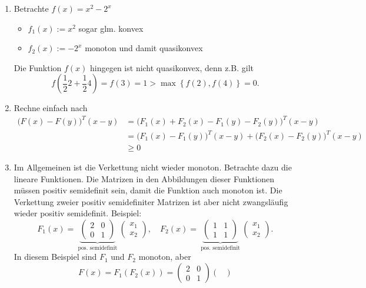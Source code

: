 \begin{enumerate}[label=(\alph{enumi})]
	\item Betrachte $f(x) = x^{2} - 2^{x}$
		\begin{itemize}
			\item $f_{1}(x):=x^2$ sogar glm. konvex
			\item $f_2(x):=-2^{x}$ monoton und damit quasikonvex
		\end{itemize}
		Die Funktion $f(x)$ hingegen ist nicht quasikonvex, denn z.B. gilt
		\[
			f(\frac{1}{2}2 + \frac{1}{2}4) = f(3) = 1 > \max\limits_{} \left\{ f(2), f(4) \right\} = 0
		.\] 
	\item Rechne einfach nach
		\begin{align*}
			\Big( F(x) - F(y) \Big) ^{T} (x-y) &= \Big( F_1(x) + F_2(x) - F_1(y) - F_2(y) \Big) ^{T} (x-y) \\
											   &= \Big( F_1(x) - F_1(y) \Big) ^{T}(x-y) + \Big( F_2(x) - F_2(y) \Big) ^{T}(x-y) \\
											   &\geq 0
		\end{align*}
	\item Im Allgemeinen ist die Verkettung nicht wieder monoton. Betrachte dazu die lineare Funktionen. Die Matrizen in den Abbildungen dieser Funktionen müssen positiv semidefinit sein, damit die Funktion auch monoton ist. Die Verkettung zweier positiv semidefiniter Matrizen ist aber nicht zwangsläufig wieder positiv semidefinit. Beispiel:
		\[
			F_1(x) = \underbrace{\begin{pmatrix}
				2 & 0 \\ 0 & 1
			\end{pmatrix}}_{\text{ pos. semidefinit }} 
			\begin{pmatrix}
			x_1 \\ x_2
			\end{pmatrix}
			, \quad
			F_2(x) = \underbrace{\begin{pmatrix}
				1 & 1 \\ 1 & 1
			\end{pmatrix}}_{\text{ pos. semidefinit }} 
			\begin{pmatrix}
			x_1 \\ x_2
			\end{pmatrix}
		.\] 
		In diesem Beispiel sind $F_1$ und $F_{2}$ monoton, aber
		\[
			F(x) = F_1(F_2(x)) = \begin{pmatrix}
				2 & 0 \\ 0 & 1
			\end{pmatrix}
			\begin{pmatrix}

\end{pmatrix}\]
\end{enumerate}

